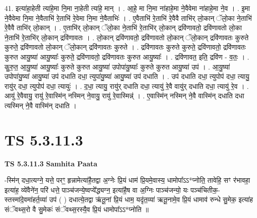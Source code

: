 \documentclass[17pt]{extarticle}
\begin{document}
41. इत्या॑हा॒हेती त्या॑हे॒मा नि॒मा ना॒हेती त्या॑हे॒ मान् । . आ॒हे॒ मा नि॒मा ना॑हाहे॒मा ने॒वैवेमा ना॑हाहे॒मा ने॒व । . इ॒मा ने॒वैवेमा नि॒मा ने॒वैताभि॑ रे॒ताभि॑ रे॒वेमा नि॒मा ने॒वैताभिः॑ । . ए॒वैताभि॑ रे॒ताभि॑ रे॒वैवै ताभि॑र् लो॒कान् ॅलो॒का ने॒ताभि॑ रे॒वैवै ताभि॑र् लो॒कान् । . ए॒ताभि॑र् लो॒कान् ॅलो॒का ने॒ताभि॑ रे॒ताभि॑र् लो॒कान् द्रवि॑णावतो॒ द्रवि॑णावतो लो॒का ने॒ताभि॑ रे॒ताभि॑र् लो॒कान् द्रवि॑णावतः । . लो॒कान् द्रवि॑णावतो॒ द्रवि॑णावतो लो॒कान् ॅलो॒कान् द्रवि॑णावतः कुरुते कुरुते॒ द्रवि॑णावतो लो॒कान् ॅलो॒कान् द्रवि॑णावतः कुरुते । . द्रवि॑णावतः कुरुते कुरुते॒ द्रवि॑णावतो॒ द्रवि॑णावतः कुरुत आयु॒ष्या॑ आयु॒ष्याः᳚ कुरुते॒ द्रवि॑णावतो॒ द्रवि॑णावतः कुरुत आयु॒ष्याः᳚ । . द्रवि॑णावत॒ इति॒ द्रवि॑ण - व॒तः॒ । . कु॒रु॒त॒ आ॒यु॒ष्या॑ आयु॒ष्याः᳚ कुरुते कुरुत आयु॒ष्या॑ उपोपा॑यु॒ष्याः᳚ कुरुते कुरुत आयु॒ष्या॑ उप॑ । . आ॒यु॒ष्या॑ उपोपा॑यु॒ष्या॑ आयु॒ष्या॑ उप॑ दधाति दधा॒ त्युपा॑यु॒ष्या॑ आयु॒ष्या॑ उप॑ दधाति । . उप॑ दधाति दधा॒ त्युपोप॑ दधा॒ त्यायु॒ रायु॑र् दधा॒ त्युपोप॑ दधा॒ त्यायुः॑ । . द॒धा॒ त्यायु॒ रायु॑र् दधाति दधा॒ त्यायु॑ रे॒वै वायु॑र् दधाति दधा॒ त्यायु॑ रे॒व । . आयु॑ रे॒वैवायु॒ रायु॑ रे॒वास्मि॑न् नस्मिन् ने॒वायु॒ रायु॑ रे॒वास्मिन्न्॑ । . ए॒वास्मि॑न् नस्मिन् ने॒वै वास्मि॑न् दधाति दधा त्यस्मिन् ने॒वै वास्मि॑न् दधाति । \newline
\pagebreak
{}

\section{ TS 5.3.11.3 }

\textbf{TS 5.3.11.3 } \newline
\textbf{Samhita Paata} \newline

-स्मि॑न् दधा॒त्यग्ने॒ यत्ते॒ परꣳ॒॒ हृन्नामेत्या॑है॒तद्वा अ॒ग्नेः प्रि॒यं धाम॑ प्रि॒यमे॒वास्य॒ धामोपा᳚ऽऽ*प्नोति॒ तावेहि॒ सꣳ र॑भावहा॒ इत्या॑ह॒ व्ये॑वैने॑न॒ परि॑ धत्ते॒ पाञ्च॑जन्ये॒ष्वप्ये᳚द्ध्यग्न॒ इत्या॑है॒ष वा अ॒ग्निः पाञ्च॑जन्यो॒ यः पञ्च॑चितीक॒-स्तस्मा॑दे॒वमा॑हर्त॒व्या॑ उप॑ ( ) दधात्ये॒तद्वा ऋ॑तू॒नां प्रि॒यं धाम॒ यदृ॑त॒व्या॑ ऋतू॒नामे॒व प्रि॒यं धामाव॑ रुन्धे सु॒मेक॒ इत्या॑ह संॅवथ्स॒रो वै सु॒मेकः॑ संॅवथ्स॒रस्यै॒व प्रि॒यं धामोपा᳚ऽऽ*प्नोति ॥ \newline
\end{document}
